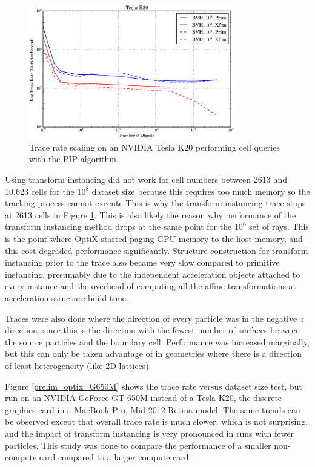 \begin{figure}[h!] 
  \centering
    \includegraphics[width=0.8\textwidth]{graphics/prelim_optix_scaling.eps}
     \caption{Trace rate scaling on an NVIDIA Tesla K20 performing cell queries with the PIP algorithm. \label{prelim_optix_scaling} }
\end{figure}

Using transform instancing did not work for cell numbers between 2613 and 10,623 cells for the $10^8$ dataset size because this requires too much memory so the tracking process cannot execute %
This is why the transform instancing trace stops at 2613 cells in Figure \ref{prelim_optix_scaling}.  This is also likely the reason why performance of the transform instancing method drops at the same point for the $10^6$ set of rays.  This is the point where OptiX started paging GPU memory to the host memory, and this cost degraded performance significantly.  Structure construction for transform instancing prior to the trace also became very slow compared to primitive instancing, presumably due to the independent acceleration objects attached to every instance and the overhead of computing all the affine transformations at acceleration structure build time.

Traces were also done where the direction of every particle was in the negative $z$ direction, since this is the direction with the fewest number of surfaces between the source particles and the boundary cell.  Performance was increased marginally, but this can only be taken advantage of in geometries where there is a direction of least heterogeneity (like 2D lattices).%

Figure \ref{prelim_optix_G650M} shows the trace rate versus dataset size test, but run on an NVIDIA GeForce GT 650M instead of a Tesla K20, the discrete graphics card in a MacBook Pro, Mid-2012 Retina model.  The same trends can be observed except that overall trace rate is much slower, which is not surprising,%
 and the impact of transform instancing is very pronounced in runs with fewer particles.  This study was done to compare the performance of a smaller non-compute card compared to a larger compute card.

